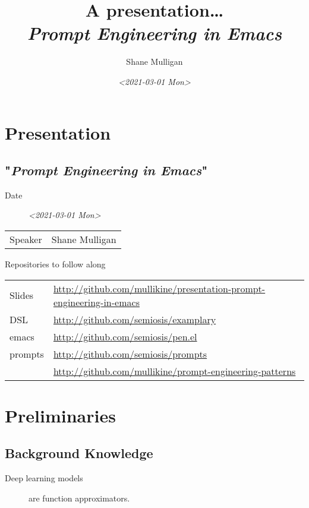 \documentclass[presentation]{beamer}
\author{Shane Mulligan \\  }
\date{\textit{<2021-03-01 Mon>}}
\title{A presentation\ldots{} \\   \emph{\alert{Prompt Engineering in Emacs}} \\  }
\begin{document}
\maketitle

\section{Presentation}
\label{sec:org9fbdc94}
\subsection{"\emph{Prompt Engineering in Emacs}"}
\label{sec:orgcc095ef}
\begin{description}
\item[{Date}] \textit{<2021-03-01 Mon>}
\end{description}

\begin{center}
\begin{tabular}{ll}
Speaker & Shane Mulligan\\
\end{tabular}
\end{center}

\begin{frame}[label={sec:org6008c44}]{Repositories to follow along}
\begin{center}
\begin{tabular}{ll}
Slides & \url{http://github.com/mullikine/presentation-prompt-engineering-in-emacs}\\
DSL & \url{http://github.com/semiosis/examplary}\\
emacs & \url{http://github.com/semiosis/pen.el}\\
prompts & \url{http://github.com/semiosis/prompts}\\
 & \url{http://github.com/mullikine/prompt-engineering-patterns}\\
\end{tabular}
\end{center}
\end{frame}

\section{Preliminaries}
\label{sec:org82262f0}
\subsection{Background Knowledge}
\label{sec:org4be7dbe}
\begin{description}
\item[{Deep learning models}] are function approximators.
\end{description}
\end{document}
